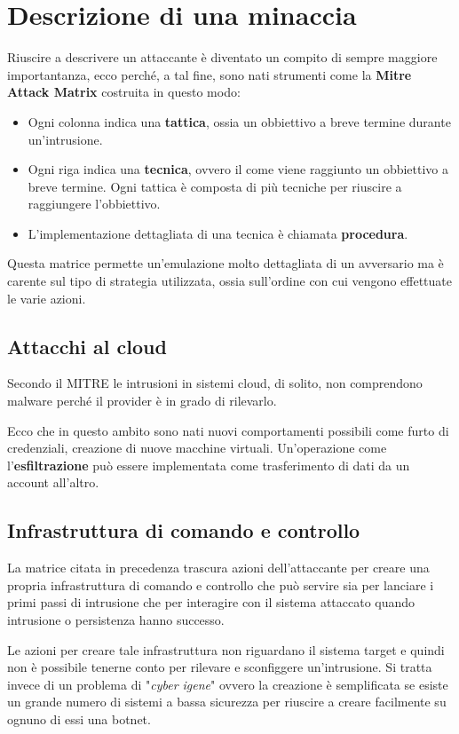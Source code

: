 \chapter{Descrizione di una minaccia}
Riuscire a descrivere un attaccante è diventato un compito di sempre maggiore importantanza, ecco perché, a tal fine,
sono nati strumenti come la \textbf{Mitre Attack Matrix} costruita in questo modo:
\begin{itemize}
	\item Ogni colonna indica una \textbf{tattica}, ossia un obbiettivo a breve termine durante un'intrusione.
	\item Ogni riga indica una \textbf{tecnica}, ovvero il come viene raggiunto un obbiettivo a breve termine. Ogni
	      tattica è composta di più tecniche per riuscire a raggiungere l'obbiettivo.
	\item L'implementazione dettagliata di una tecnica è chiamata \textbf{procedura}.
\end{itemize}
Questa matrice permette un'emulazione molto dettagliata di un avversario ma è carente sul tipo di strategia utilizzata,
ossia sull'ordine con cui vengono effettuate le varie azioni.

\section{Attacchi al cloud}
Secondo il MITRE le intrusioni in sistemi cloud, di solito, non comprendono malware perché il provider è in grado di
rilevarlo.

Ecco che in questo ambito sono nati nuovi comportamenti possibili come furto di credenziali, creazione di nuove
macchine virtuali. Un'operazione come l'\textbf{esfiltrazione} può essere implementata come trasferimento di dati
da un account all'altro.

\section{Infrastruttura di comando e controllo}
La matrice citata in precedenza trascura azioni dell'attaccante per creare una propria infrastruttura di comando e
controllo che può servire sia per lanciare i primi passi di intrusione che per interagire con il sistema attaccato
quando intrusione o persistenza hanno successo.

Le azioni per creare tale infrastruttura non riguardano il sistema target e quindi non è possibile tenerne conto per
rilevare e sconfiggere un'intrusione. Si tratta invece di un problema di "\emph{cyber igene}" ovvero la creazione è
semplificata se esiste un grande numero di sistemi a bassa sicurezza per riuscire a creare facilmente su ognuno di
essi una botnet.
